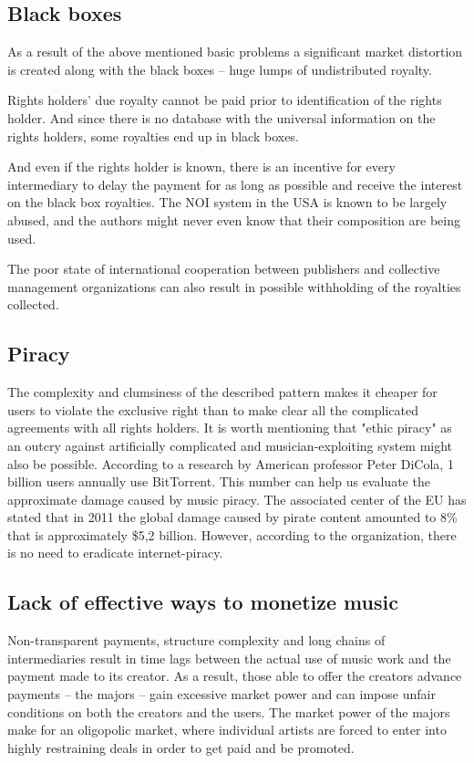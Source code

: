 \documentclass[12pt]{report}
\begin{document}
\subsection{Black boxes}
As a result of the above mentioned basic problems a significant market distortion is created along with the black boxes – huge lumps of undistributed royalty.
 
Rights holders' due royalty cannot be paid prior to identification of the rights holder. And since there is no database with the universal information on the rights holders, some royalties end up in black boxes.
 
And even if the rights holder is known, there is an incentive for every intermediary to delay the payment for as long as possible and receive the interest on the black box royalties. The NOI system in the USA is known to be largely abused, and the authors might never even know that their composition are being used.
 
The poor state of international cooperation between publishers and collective management organizations can also result in possible withholding of the royalties collected.

\subsection{Piracy}
The complexity and clumsiness of the described pattern makes it cheaper for users to violate the exclusive right than to make clear all the complicated agreements with all rights holders. It is worth mentioning that "ethic piracy" as an outcry against artificially complicated and musician-exploiting system might also be possible. According to a research by American professor Peter DiCola, 1 billion users annually use BitTorrent. This number can help us evaluate the approximate damage caused by music piracy. The associated center of the EU has stated that in 2011 the global damage caused by pirate content amounted to 8\% that is approximately \$5,2 billion. However, according to the organization, there is no need to eradicate internet-piracy.

\subsection{Lack of effective ways to monetize music}
Non-transparent payments, structure complexity and long chains of intermediaries result in time lags between the actual use of music work and the payment made to its creator. As a result, those able to offer the creators advance payments – the majors – gain excessive market power and can impose unfair conditions on both the creators and the users. The market power of the majors make for an oligopolic market, where individual artists are forced to enter into highly restraining deals in order to get paid and be promoted.
\end{document}
